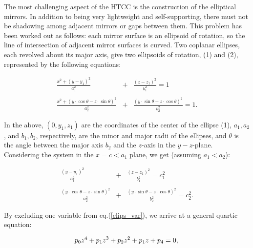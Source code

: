 The most challenging aspect of the HTCC is the construction of the
elliptical mirrors.  In addition to being very lightweight and 
self-supporting, there must not be shadowing among adjacent mirrors or gaps 
between them. This problem has been worked out as follows: each mirror 
surface is an ellipsoid of rotation, so the line of intersection of adjacent  
mirror surfaces is curved.  Two coplanar ellipses, each revolved about its 
major axis, give two ellipsoids of rotation, (1) and (2), represented by the
following equations:
 
\begin{eqnarray}
\label{elips}
\frac{x^2+(y-y_1)^2}{a_1^2} &+& \frac{(z-z_1)^2}{b_1^2} = 1  \nonumber\\
\hspace{1in}\\
\frac{x^2+(y \cdot \cos \theta-z \cdot \sin \theta)^2}{a_2^2} &+& 
\frac{(y \cdot \sin \theta-z \cdot \cos \theta)^2}{b_2^2} = 1. \nonumber  
\end{eqnarray}

\noindent
In the above, $(0,y_1,z_1)$ are the coordinates of the center of the ellipse 
(1), $a_1, a_2$, and $b_1, b_2$, respectively, are the minor and major radii 
of the ellipses, and $\theta$ is the angle between the major axis $b_2$ and 
the $z$-axis in the $y-z$-plane.  Considering the system in the $x = c < a_1$  
plane, we get (assuming $a_1 < a_2$): 

\begin{eqnarray}
\label{elips_var}
\frac{(y-y_1)^2}{a_1^2} &+& \frac{(z-z_1)^2}{b_1^2} = c_1^2 \nonumber \\
\hspace{1in}\\
\frac{(y \cdot \cos \theta-z \cdot \sin \theta)^2}{a_2^2} &+& 
\frac{(y \cdot \sin \theta-z \cdot \cos \theta)^2}{b_2^2} = c_2^2. \nonumber  
\end{eqnarray} 
 
By excluding one variable from eq.(\ref{elips_var}), we arrive at a general 
quartic equation:

\begin{equation}
p_0z^4 + p_1 z^3 + p_2 z^2 + p_1 z + p_4=0, \nonumber \\
\end{equation} 

